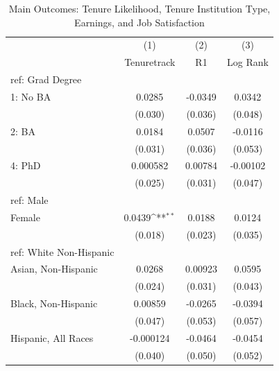 \begin{table}[htbp]\centering
\def\sym#1{\ifmmode^{#1}\else\(^{#1}\)\fi}
\caption{Main Outcomes: Tenure Likelihood, Tenure Institution Type, Earnings, and Job Satisfaction \label{tab1}}
\begin{tabular}{l*{3}{c}}
\hline\hline
  &\multicolumn{1}{c}{(1)}&\multicolumn{1}{c}{(2)}&\multicolumn{1}{c}{(3)}\\
  &\multicolumn{1}{c}{Tenuretrack}&\multicolumn{1}{c}{R1}&\multicolumn{1}{c}{Log Rank}\\
\hline
ref: Grad Degree&                     &                     &                     \\
[1em]
1: No BA&      0.0285         &     -0.0349         &      0.0342         \\
  &     (0.030)         &     (0.036)         &     (0.048)         \\
[1em]
2: BA&      0.0184         &      0.0507         &     -0.0116         \\
  &     (0.031)         &     (0.036)         &     (0.053)         \\
[1em]
4: PhD&    0.000582         &     0.00784         &    -0.00102         \\
  &     (0.025)         &     (0.031)         &     (0.047)         \\
[1em]
ref: Male&                     &                     &                     \\
[1em]
Female&      0.0439\sym{**} &      0.0188         &      0.0124         \\
  &     (0.018)         &     (0.023)         &     (0.035)         \\
[1em]
ref: White Non-Hispanic&                     &                     &                     \\
[1em]
Asian, Non-Hispanic&      0.0268         &     0.00923         &      0.0595         \\
  &     (0.024)         &     (0.031)         &     (0.043)         \\
[1em]
Black, Non-Hispanic&     0.00859         &     -0.0265         &     -0.0394         \\
  &     (0.047)         &     (0.053)         &     (0.057)         \\
[1em]
Hispanic, All Races&   -0.000124         &     -0.0464         &     -0.0454         \\
  &     (0.040)         &     (0.050)         &     (0.052)         \\

\end{tabular}
\end{table}
